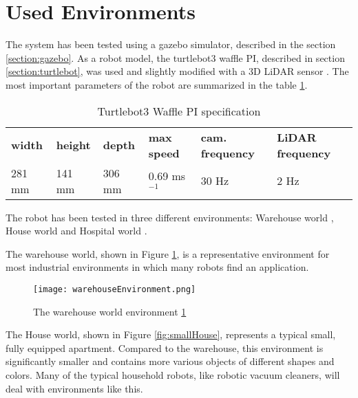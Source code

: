 \section{Used Environments}\label{section:environments}

The system has been tested using a gazebo simulator, described in the section \ref{section:gazebo}. As a robot model, the turtlebot3 waffle PI, described in section \ref{section:turtlebot}, was used and slightly modified with a 3D LiDAR sensor \cite{VelodyneSimulator}. The most important parameters of the robot are summarized in the table \ref{tab:turtlebot}.

\begin{table}[htpb]
    \caption{Turtlebot3 Waffle PI specification}\label{tab:turtlebot}
    \centering
    \begin{tabular}{l l l l l l}
        \toprule
        \textbf{width} & \textbf{height} & \textbf{depth} & \textbf{max speed} & \textbf{cam. frequency} & \textbf{LiDAR frequency} \\
        281 mm         & 141 mm          & 306 mm         & 0.69 ms${}^{-1}$   & 30 Hz                   & 2 Hz                     \\
        \bottomrule
    \end{tabular}
\end{table}

The robot has been tested in three different environments: Warehouse world \cite{WarehouseWorld}, House world \cite{HouseWorld} and Hospital world \cite{HospitalWorld}.\par
The warehouse world, shown in Figure \ref{fig:warehouseWorld}, is a representative environment for most industrial environments in which many robots find an application.\par

\begin{figure}[htpb]
    \centering
    \texttt{[image: warehouseEnvironment.png]}
    \caption{The warehouse world environment \ref{fig:warehouseWorld}} \label{fig:warehouseWorld}
\end{figure}

The House world, shown in Figure \ref{fig:smallHouse}, represents a typical small, fully equipped apartment. Compared to the warehouse, this environment is significantly smaller and contains more various objects of different shapes and colors. Many of the typical household robots, like robotic vacuum cleaners, will deal with environments like this.\par


